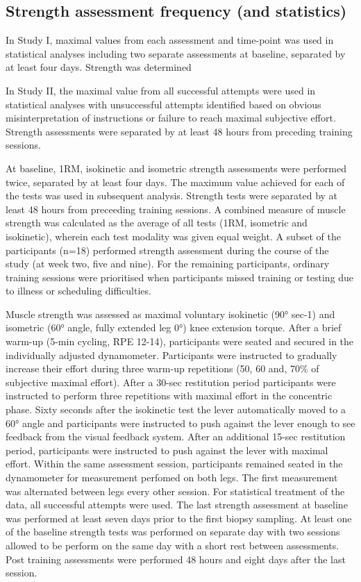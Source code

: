 \documentclass[twoside,10pt]{gihclass} %
\begin{document}
\hypertarget{strength-assessment-frequency-and-statistics}{%
\subsection{Strength assessment frequency (and statistics)}\label{strength-assessment-frequency-and-statistics}}

In Study I, maximal values from each assessment and time-point was used in statistical analyses including two separate assessments at baseline, separated by at least four days. Strength was determined

In Study II, the maximal value from all successful attempts were used in statistical analyses with unsuccessful attempts identified based on obvious misinterpretation of instructions or failure to reach maximal subjective effort.\\
Strength assessments were separated by at least 48 hours from preceding training sessions.

At baseline, 1RM, isokinetic and isometric strength assessments were performed twice, separated by at least four days. The maximum value achieved for each of the tests was used in subsequent analysis. Strength tests were separated by at least 48 hours from preceeding training sessions. A combined measure of muscle strength was calculated as the average of all tests (1RM, isometric and isokinetic), wherein each test modality was given equal weight. A subset of the participants (n=18) performed strength assessment during the course of the study (at week two, five and nine). For the remaining participants, ordinary training sessions were prioritised when participants missed training or testing due to illness or scheduling difficulties.

Muscle strength was assessed as maximal voluntary isokinetic (90° sec-1) and isometric (60° angle, fully extended leg 0°) knee extension torque. After a brief warm-up (5-min cycling, RPE 12-14), participants were seated and secured in the individually adjusted dynamometer. Participants were instructed to gradually increase their effort during three warm-up repetitions (50, 60 and, 70\% of subjective maximal effort). After a 30-sec restitution period participants were instructed to perform three repetitions with maximal effort in the concentric phase. Sixty seconds after the isokinetic test the lever automatically moved to a 60° angle and participants were instructed to push against the lever enough to see feedback from the visual feedback system. After an additional 15-sec restitution period, participants were instructed to push against the lever with maximal effort. Within the same assessment session, participants remained seated in the dynamometer for measurement perfomed on both legs. The first measurement was alternated between legs every other session. For statistical treatment of the data, all successful attempts were used. The last strength assessment at baseline was performed at least seven days prior to the first biopsy sampling. At least one of the baseline strength tests was performed on separate day with two sessions allowed to be perform on the same day with a short rest between assessments. Post training assessments were performed 48 hours and eight days after the last session.
\end{document}
